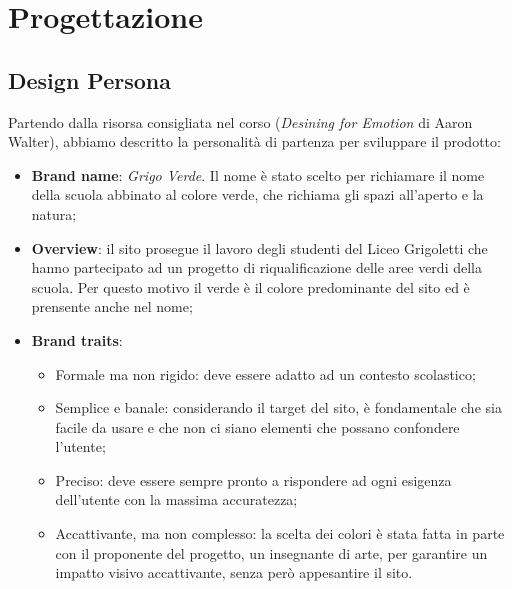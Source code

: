 \section{Progettazione}

\subsection{Design Persona}

Partendo dalla risorsa consigliata nel corso (\textit{Desining for Emotion} di
Aaron Walter), abbiamo descritto la personalità di partenza per sviluppare il
prodotto:

\begin{itemize}
	\item \textbf{Brand name}: \textit{Grigo Verde}. Il nome è stato scelto per
	      richiamare il nome della scuola abbinato al colore verde, che richiama
	      gli spazi all'aperto e la natura;

	\item \textbf{Overview}: il sito prosegue il lavoro degli studenti del Liceo
	      Grigoletti che hanno partecipato ad un progetto di riqualificazione
	      delle aree verdi della scuola. Per questo motivo il verde è il colore
	      predominante del sito ed è prensente anche nel nome;

	\item \textbf{Brand traits}:
	      \begin{itemize}
		      \item Formale ma non rigido: deve essere adatto ad un contesto
		            scolastico;

		      \item Semplice e banale: considerando il target del sito, è
		            fondamentale che sia facile da usare e che non ci siano
		            elementi che possano confondere l'utente;

		      \item Preciso: deve essere sempre pronto a rispondere ad ogni
		            esigenza dell'utente con la massima accuratezza;

		      \item Accattivante, ma non complesso: la scelta dei colori è
		            stata fatta in parte con il proponente del progetto, un
		            insegnante di arte, per garantire un impatto visivo
		            accattivante, senza però appesantire il sito.
	      \end{itemize}


\end{itemize}
